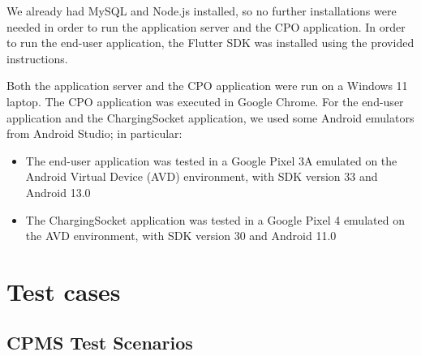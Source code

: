 \documentclass{Configuration_Files/PoliMi3i_thesis}
\begin{document}
We already had MySQL and Node.js installed, so no further installations were needed in order to run the application server and the CPO application. In order to run the end-user application, the Flutter SDK was installed using the provided instructions.

Both the application server and the CPO application were run on a Windows 11 laptop. The CPO application was executed in Google Chrome. For the end-user application and the ChargingSocket application, we used some Android emulators from Android Studio; in particular:
\begin{itemize}
    \item The end-user application was tested in a Google Pixel 3A emulated on the Android Virtual Device (AVD) environment, with SDK version 33 and Android 13.0
    \item The ChargingSocket application was tested in a Google Pixel 4 emulated on the AVD environment, with SDK version 30 and Android 11.0
\end{itemize}

\chapter{Test cases}

\section{CPMS Test Scenarios}
\end{document}
